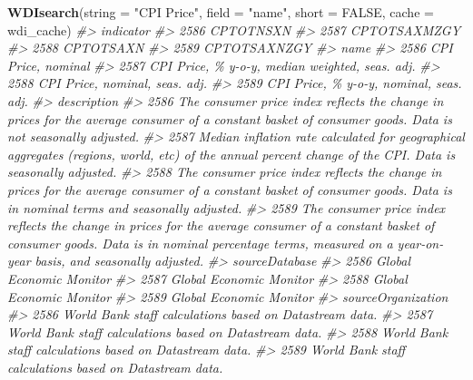 \documentclass[
  xelatex, ja=standard]{bxjsbook}
\newenvironment{Shaded}{\begin{snugshade}}{\end{snugshade}}
\newcommand{\AttributeTok}[1]{\textcolor[rgb]{0.13,0.29,0.53}{#1}}
\newcommand{\CommentTok}[1]{\textcolor[rgb]{0.56,0.35,0.01}{\textit{#1}}}
\newcommand{\ConstantTok}[1]{\textcolor[rgb]{0.56,0.35,0.01}{#1}}
\newcommand{\FunctionTok}[1]{\textcolor[rgb]{0.13,0.29,0.53}{\textbf{#1}}}
\newcommand{\NormalTok}[1]{#1}
\newcommand{\StringTok}[1]{\textcolor[rgb]{0.31,0.60,0.02}{#1}}
\theoremstyle{definition}
\theoremstyle{definition}
\theoremstyle{definition}
\theoremstyle{definition}
\theoremstyle{remark}
\begin{document}
\begin{Shaded}
\begin{Highlighting}[]
\FunctionTok{WDIsearch}\NormalTok{(}\AttributeTok{string =} \StringTok{"CPI Price"}\NormalTok{, }\AttributeTok{field =} \StringTok{"name"}\NormalTok{, }\AttributeTok{short =} \ConstantTok{FALSE}\NormalTok{, }\AttributeTok{cache =}\NormalTok{ wdi\_cache)}
\CommentTok{\#\textgreater{}         indicator}
\CommentTok{\#\textgreater{} 2586    CPTOTNSXN}
\CommentTok{\#\textgreater{} 2587 CPTOTSAXMZGY}
\CommentTok{\#\textgreater{} 2588    CPTOTSAXN}
\CommentTok{\#\textgreater{} 2589 CPTOTSAXNZGY}
\CommentTok{\#\textgreater{}                                                 name}
\CommentTok{\#\textgreater{} 2586                              CPI Price, nominal}
\CommentTok{\#\textgreater{} 2587 CPI Price, \% y{-}o{-}y, median weighted, seas. adj.}
\CommentTok{\#\textgreater{} 2588                  CPI Price, nominal, seas. adj.}
\CommentTok{\#\textgreater{} 2589         CPI Price, \% y{-}o{-}y, nominal, seas. adj.}
\CommentTok{\#\textgreater{}                                                                                                                                                                                                                  description}
\CommentTok{\#\textgreater{} 2586                                                                The consumer price index reflects the change in prices for the average consumer of a constant basket of consumer goods. Data is not seasonally adjusted.}
\CommentTok{\#\textgreater{} 2587                                                                Median inflation rate calculated for geographical aggregates (regions, world, etc) of the annual percent change of the CPI. Data is seasonally adjusted.}
\CommentTok{\#\textgreater{} 2588                                               The consumer price index reflects the change in prices for the average consumer of a constant basket of consumer goods. Data is in nominal terms and seasonally adjusted.}
\CommentTok{\#\textgreater{} 2589 The consumer price index reflects the change in prices for the average consumer of a constant basket of consumer goods. Data is in nominal percentage terms, measured on a year{-}on{-}year basis, and seasonally adjusted.}
\CommentTok{\#\textgreater{}               sourceDatabase}
\CommentTok{\#\textgreater{} 2586 Global Economic Monitor}
\CommentTok{\#\textgreater{} 2587 Global Economic Monitor}
\CommentTok{\#\textgreater{} 2588 Global Economic Monitor}
\CommentTok{\#\textgreater{} 2589 Global Economic Monitor}
\CommentTok{\#\textgreater{}                                           sourceOrganization}
\CommentTok{\#\textgreater{} 2586 World Bank staff calculations based on Datastream data.}
\CommentTok{\#\textgreater{} 2587 World Bank staff calculations based on Datastream data.}
\CommentTok{\#\textgreater{} 2588 World Bank staff calculations based on Datastream data.}
\CommentTok{\#\textgreater{} 2589 World Bank staff calculations based on Datastream data.}
\end{Highlighting}
\end{Shaded}
\end{document}
